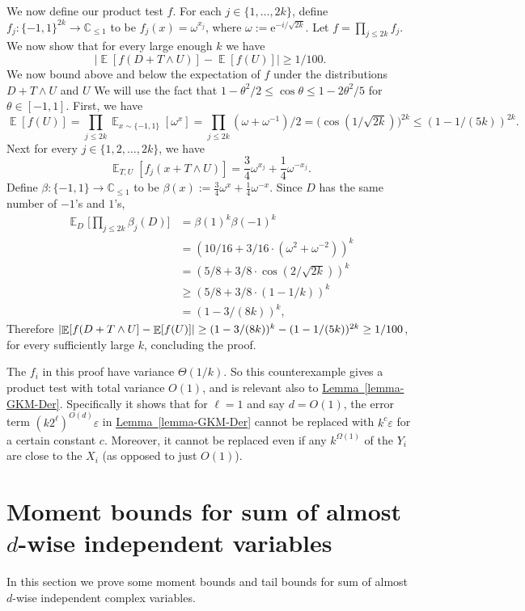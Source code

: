 \documentclass[11pt]{article}
\numberwithin{equation}{section}
\theoremstyle{definition}
\theoremstyle{plain}
\newcommand{\C}{\mathbb C}
\newcommand{\eee}{\mathrm e}
\newcommand{\expref}[2]{\hyperref[#2]{#1~\ref{#2}}}
\def\eps{\varepsilon}
\def\pmone{\{-1, 1\}}
\def\Blocklength{\ell}
\DeclarePairedDelimiter{\abs}{\lvert}{\rvert}
\DeclareMathOperator*{\E}{\mathbb{E}}                 %
\begin{document}
    We now define our product test $f$.
    For each $j \in \{1, \ldots, 2k\}$, define $f_j\colon \pmone^{2k} \to \C_{\le 1}$ to be $f_j(x) = \omega^{x_j}$, where $\omega := \eee^{-i/\sqrt{2k}}$.
    Let $f = \prod_{j \le 2k} f_j$.
    We now show that for every large enough $k$ we have
    \[
      \Big| \E[f(D + T \wedge U)] - \E[f(U)] \Big| \ge 1/100 .
    \]
    We now bound above and below the expectation of $f$ under the distributions $D + T\wedge U$ and $U$
    We will use the fact that $1 - \theta^2/2  \le \cos \theta \le 1 - 2 \theta^2 / 5$ for $\theta \in [-1,1]$.
    First, we have
    \[
      \E[f(U)]
      = \prod_{j \le 2k} \E_{x \sim \pmone} [\omega^{x}]
      = \prod_{j \le 2k} (\omega + \omega^{-1}) / 2
      = \Big( \cos(1 / \sqrt{2k}) \Big)^{2k}
      \le (1 - 1/(5k))^{2k} .
    \]
    Next for every $j \in \{1, 2, \ldots, 2k\}$, we have
    \[
      \E_{T,U} [f_j(x + T \wedge U)]
      = \frac{3}{4} \omega^{x_j} + \frac{1}{4} \omega^{-x_j} .
    \]
    Define $\beta \colon \pmone \to \C_{\le 1}$ to be $\beta(x) := \frac{3}{4} \omega^{x} + \frac{1}{4} \omega^{-x}$.
    Since $D$ has the same number of $-1$'s and $1$'s,
    \begin{align*}
      \E_D \Big[ \prod_{j \le 2k} \beta_j(D) \Big]
      &= \beta(1)^k \beta(-1)^k \\
      &= (10/16 + 3/16 \cdot (\omega^2 + \omega^{-2}))^k \\
      &= (5/8 + 3/8 \cdot \cos(2/\sqrt{2k}))^k \\
      &\ge (5/8 + 3/8 \cdot (1 - 1/k))^k \\
      &= (1 - 3/(8k))^k ,
    \end{align*}
    Therefore $\abs{\E[f(D + T \wedge U] - \E[f(U)]} \ge (1 - 3/(8k))^{k} - (1 - 1/(5k))^{2k} \ge 1/100$, for every sufficiently large
    $k$, concluding the proof.

  The $f_i$ in this proof have variance $\Theta(1/k)$.
  So this counterexample gives a product test with total variance $O(1)$, and is relevant also to \expref{Lemma}{lemma-GKM-Der}.
  Specifically it shows that for $\Blocklength = 1$ and say $d = O(1)$, the error term $(k 2^\Blocklength)^{O(d)} \eps$ in \expref{Lemma}{lemma-GKM-Der} cannot be replaced with $k^c \eps$ for a certain constant $c$.
  Moreover, it cannot be replaced even if any $k^{\Omega(1)}$ of the $Y_i$ are close to the $X_i$ (as opposed to just $O(1)$).


\section{Moment bounds for sum of almost \texorpdfstring{$d$}{d}-wise independent variables} \label{sec:moment-bounds}
  In this section we prove some moment bounds and tail bounds for sum of almost $d$-wise independent complex variables.
\end{document}
